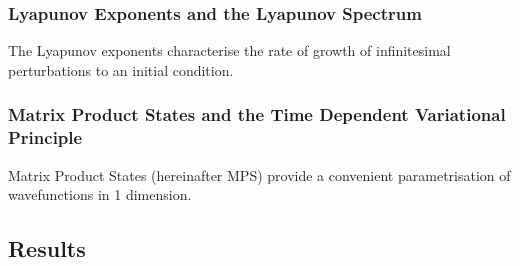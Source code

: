 \documentclass{article}
\begin{document}
\subsubsection{Lyapunov Exponents and the Lyapunov Spectrum}
The Lyapunov exponents characterise the rate of growth of infinitesimal perturbations to an initial condition.
\subsubsection{Matrix Product States and the Time Dependent Variational Principle}
Matrix Product States (hereinafter MPS) provide a convenient parametrisation of wavefunctions in 1 dimension.
\subsection{Results}



\end{document}
